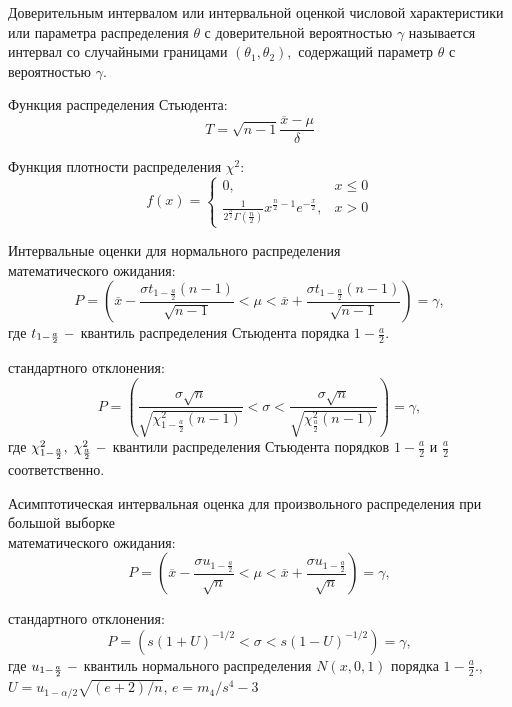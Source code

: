 \documentclass[a4]{article}
\begin{document}
Доверительным интервалом или интервальной оценкой числовой характеристики или параметра распределения $\theta$ с доверительной вероятностью $\gamma$ называется интервал со случайными границами $(\theta_1,\theta_2),$ содержащий параметр $\theta$ с вероятностью $\gamma$.

Функция распределения Стьюдента:
\begin{equation}
T = \sqrt{n-1}\frac{\overline{x}-\mu}{\delta}
\end{equation}

Функция плотности распределения $\chi^2$:
\begin{equation}
f(x) = \begin{cases}
0,&x\leq 0\\
\frac{1}{2^\frac{n}{2}\Gamma\left(\frac{n}{2}\right)}x^{\frac{n}{2}-1}e^{-\frac{x}{2}},& x>0
\end{cases}
\end{equation}

Интервальные оценки для нормального распределения\\
математического ожидания:
\begin{equation}
P=\left(\overline{x}-\frac{\sigma t_{1-\frac{a}{2}}(n-1)}{\sqrt{n-1}}<\mu<\overline{x}+\frac{\sigma t_{1-\frac{a}{2}}(n-1)}{\sqrt{n-1}}\right) = \gamma,
\end{equation}
где $t_{1-\frac{a}{2}}\;\--$ квантиль распределения Стьюдента порядка $1-\frac{a}{2}.$

стандартного отклонения:
\begin{equation}
P=\left(\frac{\sigma\sqrt{n}}{\sqrt{\chi^2_{1-\frac{a}{2}}(n-1)}}<\sigma<\frac{\sigma\sqrt{n}}{\sqrt{\chi^2_\frac{a}{2}(n-1)}}\right) = \gamma,
\end{equation}
где $\chi_{1-\frac{a}{2}}^2,\;\chi_\frac{a}{2}^2\;\--$ квантили распределения Стьюдента порядков $1-\frac{a}{2}$ и $\frac{a}{2}$ соответственно.

Асимптотическая интервальная оценка для произвольного распределения при большой выборке\\
математического ожидания:
\begin{equation}
P = \left(\overline{x}-\frac{\sigma u_{1-\frac{a}{2}}}{\sqrt{n}}<\mu<\overline{x}+\frac{\sigma u_{1-\frac{a}{2}}}{\sqrt{n}}\right)=\gamma,
\end{equation}

стандартного отклонения:
\begin{equation}
P=\left(s(1  + U)^{-1/2}<\sigma<s(1  - U)^{-1/2}\right) = \gamma,
\end{equation}
где $u_{1-\frac{a}{2}}\;\--$ квантиль нормального распределения $N(x,0,1)$ порядка $1-\frac{a}{2}.$, $ U = u_{1 - \alpha/2}\sqrt{(e + 2)/n} $, $ e = m_{4}/s^{4} -3 $
\end{document}

